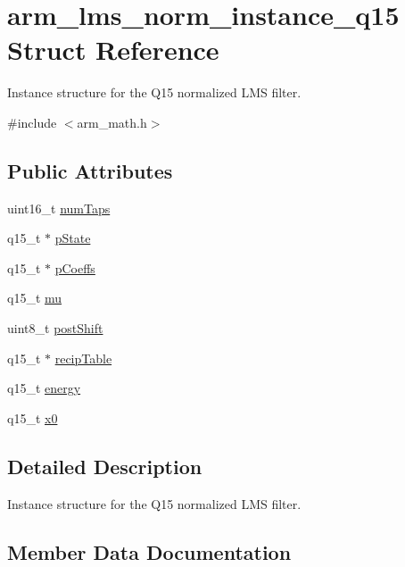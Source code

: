 \hypertarget{structarm__lms__norm__instance__q15}{}\section{arm\+\_\+lms\+\_\+norm\+\_\+instance\+\_\+q15 Struct Reference}
\label{structarm__lms__norm__instance__q15}


Instance structure for the Q15 normalized L\+MS filter.  




{\ttfamily \#include $<$arm\+\_\+math.\+h$>$}

\subsection*{Public Attributes}
\begin{DoxyCompactItemize}
\item 
uint16\+\_\+t \hyperlink{structarm__lms__norm__instance__q15_a9ee7a45f4f315d7996a969e25fdc7146}{num\+Taps}
\item 
q15\+\_\+t $\ast$ \hyperlink{structarm__lms__norm__instance__q15_aa4de490b3bdbd03561b76ee07901c8e3}{p\+State}
\item 
q15\+\_\+t $\ast$ \hyperlink{structarm__lms__norm__instance__q15_ae7bca648c75a2ffa02d87852bb78bc8a}{p\+Coeffs}
\item 
q15\+\_\+t \hyperlink{structarm__lms__norm__instance__q15_a7ce00f21d11cfda6d963240641deea8c}{mu}
\item 
uint8\+\_\+t \hyperlink{structarm__lms__norm__instance__q15_aa0d435fbcf7dedb7179d4467e9b79e9f}{post\+Shift}
\item 
q15\+\_\+t $\ast$ \hyperlink{structarm__lms__norm__instance__q15_a9aabb0e4c79f3db807e7a441fa36f5f8}{recip\+Table}
\item 
q15\+\_\+t \hyperlink{structarm__lms__norm__instance__q15_a1c81ded399919d8181026bc1c8602e7b}{energy}
\item 
q15\+\_\+t \hyperlink{structarm__lms__norm__instance__q15_a3fc1d6f97d2c6d5324871de6895cb7e9}{x0}
\end{DoxyCompactItemize}


\subsection{Detailed Description}
Instance structure for the Q15 normalized L\+MS filter. 

\subsection{Member Data Documentation}
